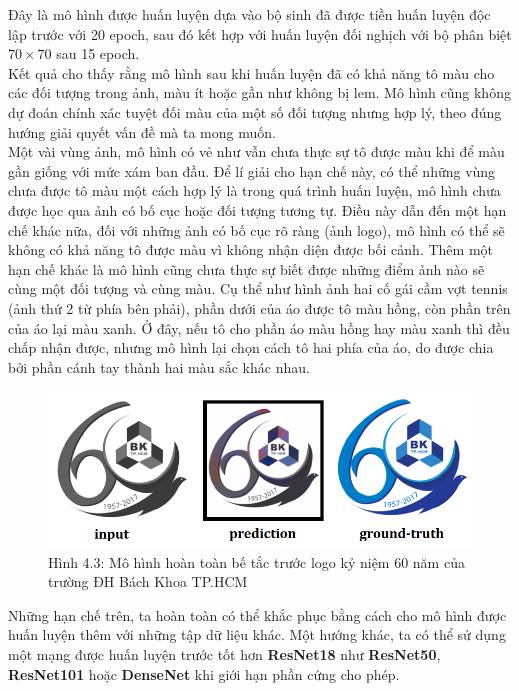 \documentclass[a4paper]{article}
\begin{document}
\noindent
Đây là mô hình được huấn luyện dựa vào bộ sinh đã được tiền huấn luyện độc lập trước với 20 epoch, sau đó kết hợp với huấn luyện đối nghịch với bộ phân biệt $70 \times 70$ sau 15 epoch.\\
Kết quả cho thấy rằng mô hình sau khi huấn luyện đã có khả năng tô màu cho các đối tượng trong ảnh, màu ít hoặc gần như không bị lem. Mô hình cũng không dự đoán chính xác tuyệt đối màu của một số đối tượng nhưng hợp lý, theo đúng hướng giải quyết vấn đề mà ta mong muốn.\\

\noindent
Một vài vùng ảnh, mô hình có vẻ như vẫn chưa thực sự tô được màu khi để màu gần giống với mức xám ban đầu. Để lí giải cho hạn chế này, có thể những vùng chưa được tô màu một cách hợp lý là trong quá trình huấn luyện, mô hình chưa được học qua ảnh có bố cục hoặc đối tượng tương tự. Điều này dẫn đến một hạn chế khác nữa, đối với những ảnh có bố cục rõ ràng (ảnh logo), mô hình có thể sẽ không có khả năng tô được màu vì không nhận diện được bối cảnh. Thêm một hạn chế khác là mô hình cũng chưa thực sự biết được những điểm ảnh nào sẽ cùng một đối tượng và cùng màu. Cụ thể như hình ảnh hai cố gái cầm vợt tennis (ảnh thứ 2 từ phía bên phải), phần dưới của áo được tô màu hồng, còn phần trên của áo lại màu xanh. Ở đây, nếu tô cho phần áo màu hồng hay màu xanh thì đều chấp nhận được, nhưng mô hình lại chọn cách tô hai phía của áo, do được chia bởi phần cánh tay thành hai màu sắc khác nhau.

\begin{figure}[h!]
\centering
\includegraphics[width=15cm]{images/4_12.PNG}
\caption{Hình 4.3: Mô hình hoàn toàn bế tắc trước logo kỷ niệm 60 năm của trường ĐH Bách Khoa TP.HCM}
\end{figure}

\noindent
Những hạn chế trên, ta hoàn toàn có thể khắc phục bằng cách cho mô hình được huấn luyện thêm với những tập dữ liệu khác. Một hướng khác, ta có thể sử dụng một mạng được huấn luyện trước tốt hơn \textbf{ResNet18} như \textbf{ResNet50}, \textbf{ResNet101} hoặc \textbf{DenseNet} khi giới hạn phần cứng cho phép.
\end{document}
